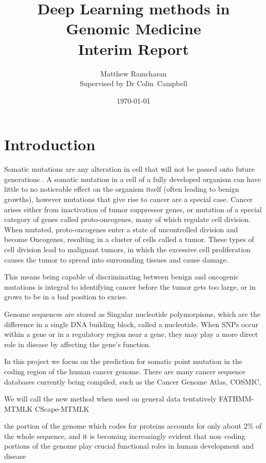 \documentclass[11pt]{article}
\title{Deep Learning methods in Genomic Medicine\\ Interim Report}
\author{Matthew Ramcharan \\ Supervised by Dr Colin\ Campbell}
\date{\today}
\begin{document}
\maketitle

\section{Introduction}

Somatic mutations are any alteration in cell that will not be passed onto future generations \cite{Griffiths2000}. A somatic mutation in a cell of a fully developed organism can have little to no noticeable effect on the organism itself (often leading to benign growths), however mutations that give rise to cancer are a special case. Cancer arises either from inactivation of tumor suppressor genes, or mutation of a special category of genes called proto-oncogenes, many of which regulate cell division. When mutated, proto-oncogenes enter a state of uncontrolled division and become Oncogenes, resulting in a cluster of cells called a tumor.  
These types of cell division lead to malignant tumors, in which the excessive cell proliferation causes the tumor to spread into surrounding tissues and cause damage. 

This means being capable of discriminating between benign and oncogenic mutations is integral to identifying cancer before the tumor gets too large, or in grows to be in a bad position to excise. 

Genome sequences are stored as Singular nucleotide polymorpisms, which are the difference in a single DNA building block, called a nucleotide. When SNPs occur within a gene or in a regulatory region near a gene, they may play a more direct role in disease by affecting the gene’s function.

In this project we focus on the prediction for somatic point mutation in the coding region of the human cancer genome. There are many cancer sequence databases currently being compiled, such as the Cancer Genome Atlas, COSMIC, 

We will call the new method when used on general data tentatively FATHMM-MTMLK
CScape-MTMLK


the portion of the genome which codes for proteins accounts for only about 2\% of the whole sequence, and it is becoming increasingly evident that non–coding portions of the genome play crucial functional roles in human development and disease\cite{Esteller2011}
\end{document}
